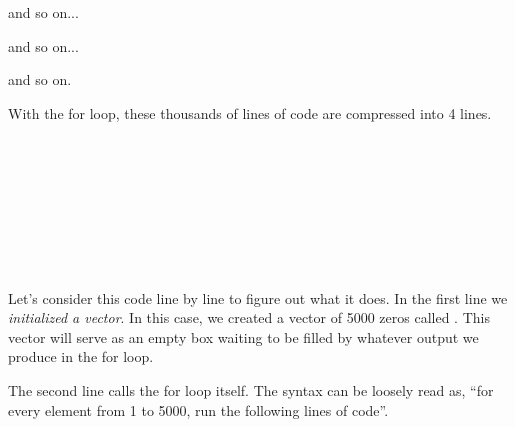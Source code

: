 \documentclass[11pt]{article}
\begin{document}
\hspace{.5 in}and so on...

\hspace{1.7 in} and so on...

\hspace{2.9 in} and so on.

With the for loop, these thousands of lines of code are compressed into 4 lines.

\ttfamily\noindent
\hlstd{}\hspace*{\fill}\\
\hlstd{}\hlassignement{\usebox{\hlnormalsizeboxlessthan}-}{\ }\hlkeyword{(}\hlkeyword{,}{\ }\hlkeyword{)}\hspace*{\fill}\\

\hlstd{}\hlkeyword{(}\hlkeyword{:}\hlkeyword{)}\hlkeyword{\usebox{\hlnormalsizeboxopenbrace}}\hspace*{\fill}\\
\hlstd{}{\ }{\ }{\ }\hlassignement{\usebox{\hlnormalsizeboxlessthan}-}{\ }\hlkeyword{(}\hlkeyword{,}{\ }\hlkeyword{)}\hspace*{\fill}\\
\hlstd{}{\ }{\ }{\ }\hlkeyword{[}\hlkeyword{]}{\ }\hlassignement{\usebox{\hlnormalsizeboxlessthan}-}{\ }\hlkeyword{(}\hlkeyword{)}\hspace*{\fill}\\
\hlstd{}{\ }{\ }{\ }\hlkeyword{(}\hlkeyword{)}\hspace*{\fill}\\
\hlstd{}{\ }{\ }{\ }\hlkeyword{\usebox{\hlnormalsizeboxclosebrace}}\hspace*{\fill}\\
\normalfont

Let's consider this code line by line to figure out what it does.  In the first line we \emph{initialized a vector}.  In this case, we created a vector of 5000 zeros called \texttt{}.  This vector will serve as an empty box waiting to be filled by whatever output we produce in the for loop.

The second line calls the for loop itself.  The syntax can be loosely read as, ``for every element \texttt{} from 1 to 5000, run the following lines of code''.
\end{document}

